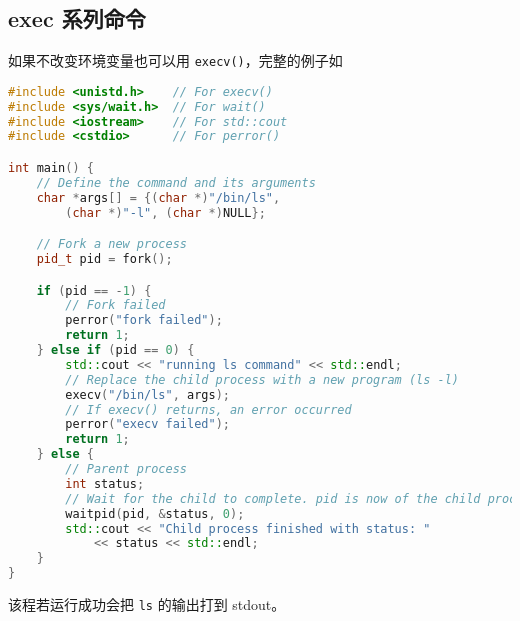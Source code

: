 
\subsection{exec 系列命令}
如果不改变环境变量也可以用 \verb`execv()`，完整的例子如
\begin{lstlisting}[language=cpp]
#include <unistd.h>    // For execv()
#include <sys/wait.h>  // For wait()
#include <iostream>    // For std::cout
#include <cstdio>      // For perror()

int main() {
    // Define the command and its arguments
    char *args[] = {(char *)"/bin/ls",
        (char *)"-l", (char *)NULL};

    // Fork a new process
    pid_t pid = fork();

    if (pid == -1) {
        // Fork failed
        perror("fork failed");
        return 1;
    } else if (pid == 0) {
        std::cout << "running ls command" << std::endl;
        // Replace the child process with a new program (ls -l)
        execv("/bin/ls", args);
        // If execv() returns, an error occurred
        perror("execv failed");
        return 1;
    } else {
        // Parent process
        int status;
        // Wait for the child to complete. pid is now of the child process
        waitpid(pid, &status, 0);
        std::cout << "Child process finished with status: "
            << status << std::endl;
    }
}
\end{lstlisting}
该程若运行成功会把 \verb`ls` 的输出打到 stdout。

